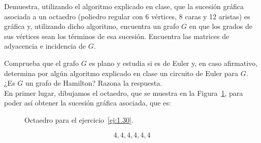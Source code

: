 \begin{ejercicio}\label{ej:1.30}
    Demuestra, utilizando el algoritmo explicado en clase, que la sucesión gráfica asociada a un octaedro (poliedro regular con 6 vértices, 8 caras y 12 aristas) es gráfica y, utilizando dicho algoritmo, encuentra un grafo $G$ en que los grados de sus vértices sean los términos de esa sucesión. Encuentra las matrices de adyacencia e incidencia de $G$.
    
    Comprueba que el grafo $G$ es plano y estudia si es de Euler y, en caso afirmativo, determina por algún algoritmo explicado en clase un circuito de Euler para $G$. ¿Es $G$ un grafo de Hamilton? Razona la respuesta.\\

    En primer lugar, dibujamos el octaedro, que se muestra en la Figura~\ref{fig:1.30_1}, para poder así obtener la sucesión gráfica asociada, que es:
    \begin{figure}
        \centering
        \caption{Octaedro para el ejercicio~\ref{ej:1.30}.}
        \label{fig:1.30_1}
    \end{figure}
    \begin{equation*}
        4,4,4,4,4,4
    \end{equation*}


\end{ejercicio}
